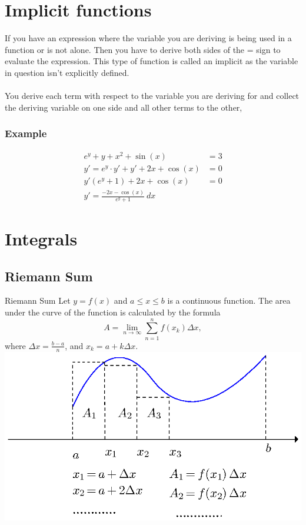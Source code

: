 \documentclass[letterpaper,10pt,twoside,twocolumn,openany]{book}
\begin{document}
\section{Implicit functions}
If you have an expression where the variable you are deriving is being used in a function or is not alone. Then you have to derive both sides of the = sign to evaluate the expression. This type of function is called an implicit as the variable in question isn't explicitly defined. 
\\~\\ 
You derive each term with respect to the variable you are deriving for and collect the deriving variable on one side and all other terms to the other,
\subsubsection{Example}
\begin{align*}
    e^y + y + x^2 + \sin(x) &= 3\\
    y' = e^y\cdot y' + y' + 2x + \cos(x) &= 0\\
    y'(e^y + 1)+ 2x + \cos(x) &= 0\\
    y' = \frac{-2x - \cos(x)}{e^y + 1}\ dx
\end{align*}
\newpage

\section{Integrals} 
\subsection{Riemann Sum}
\begin{paperbox}{Riemann Sum}
    Let $y = f ( x)$ and $a \leq x \leq b$ is a continuous function. The area under the curve of the function is calculated by the formula
    \[ A = \lim_{n \rightarrow \infty} \sum_{n = 1}^n f ( x_k) \Delta x, \]
    where $\Delta x = \frac{b - a}{n}$, and $x_k = a + k \Delta x$.
    \includegraphics[scale=0.8]{supplement-2.eps}
\end{paperbox}
\end{document}
